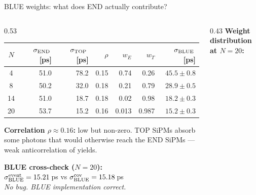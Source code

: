 \documentclass[aspectratio=169,9pt]{beamer}
\newcommand{\sE}{\sigma_{\rm END}}
\newcommand{\sT}{\sigma_{\rm TOP}}
\newcommand{\sB}{\sigma_{\rm BLUE}}
\begin{document}
\begin{frame}{BLUE weights: what does END actually contribute?}
\begin{columns}[T]
\begin{column}{0.53\textwidth}
\vspace{0.2em}
\scriptsize
\setlength{\tabcolsep}{4pt}
\renewcommand{\arraystretch}{1.35}
\begin{tabular}{crrrrrr}
\toprule
$N$ & $\sE$\,[ps] & $\sT$\,[ps] & $\rho$ & $w_E$ & $w_T$ & $\sB$\,[ps]\\
\midrule
4  & 51.0 & 78.2 & 0.15 & 0.74 & 0.26 & $45.5\pm0.8$\\
8  & 50.2 & 32.0 & 0.18 & 0.21 & 0.79 & $28.9\pm0.5$\\
14 & 51.0 & 18.7 & 0.18 & 0.02 & 0.98 & $18.2\pm0.3$\\
\rowcolor{rowbest}
20 & 53.7 & 15.2 & 0.16 & 0.013 & 0.987 & $\mathbf{15.2\pm0.3}$\\
\bottomrule
\end{tabular}

\vspace{0.4em}
\footnotesize
\textbf{Correlation $\rho\approx0.16$:} low but non-zero.
TOP SiPMs absorb some photons that would otherwise
reach the END SiPMs — weak anticorrelation of yields.

\vspace{0.3em}
\textbf{BLUE cross-check ($N{=}20$):}\\
$\sigma_{\rm BLUE}^{\rm event}=15.21$\,ps vs
$\sigma_{\rm BLUE}^{\rm cov}=15.18$\,ps \ \checkmark\\[0.2em]
\textit{No bug. BLUE implementation correct.}
\end{column}

\begin{column}{0.43\textwidth}
\vspace{0.2em}
\footnotesize
\textbf{Weight distribution at $N{=}20$:}

\vspace{0.3em}
\begin{center}
\end{center}


\end{column}
\end{columns}
\end{frame}
\end{document}
